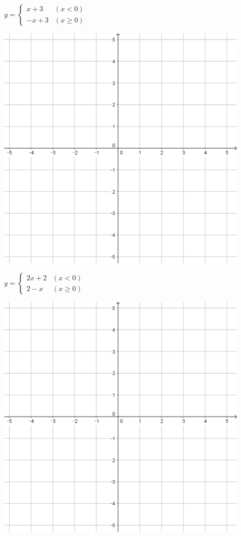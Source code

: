 \documentclass{oblivoir}
\begin{document}
\clearpage
\begin{minipage}{0.45\textwidth}\centering
\(y=\begin{cases}x+3&(x<0)\\-x+3&(x\ge0)\end{cases}\)
\par\bigskip\includegraphics[width=0.9\textwidth]{55}
\end{minipage}
\begin{minipage}{0.45\textwidth}\centering
\(y=\begin{cases}2x+2&(x<0)\\2-x&(x\ge0)\end{cases}\)
\par\bigskip\includegraphics[width=0.9\textwidth]{55}
\end{minipage}\bigskip\bigskip\par
\end{document}

